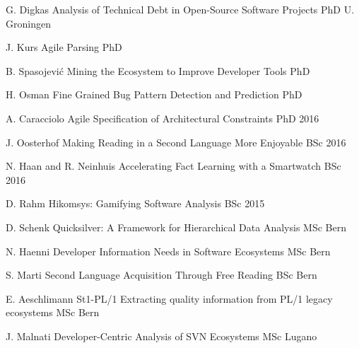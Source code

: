 \begin{enumerate}

\super 
	{G. Digkas}
	{Analysis of Technical Debt in Open-Source Software Projects}
	{PhD}
	{U. Groningen}
	{}

\super 
	{J. Kurs}
	{Agile Parsing}
	{PhD}
	{\Bern}
	{\inprogrcosup}	

\super 
	{B. Spasojevi\'{c}}
	{Mining the Ecosystem to Improve Developer Tools}
	{PhD}
	{\Bern}
	{\inprogrcosup}

\super 
	{H. Osman}
	{Fine Grained Bug Pattern Detection and Prediction}
	{PhD}
	{\Bern}
	{\inprogrcosup}	

\super 
	{A. Caracciolo}
	{Agile Specification of Architectural Constraints}
	{PhD}
	{\Bern}
	{2016 }

\super 
	{J. Oosterhof}
	{Making Reading in a Second Language More Enjoyable}
	{BSc}
	{\Groningen}
	{2016}

\super 
	{N. Haan and R. Neinhuis}
	{Accelerating Fact Learning with a Smartwatch}
	{BSc}
	{\Groningen}
	{2016}


\super 
	{D. Rahm}
	{Hikomsys: Gamifying Software Analysis}
	{BSc}
	{\Bern}
	{2015}


\super 
	{D. Schenk}
	{Quicksilver: A Framework for Hierarchical Data Analysis}
	{MSc}
	{Bern}
	{}

\super 
	{N. Haenni}
	{Developer Information Needs in Software Ecosystems}
	{MSc}
	{Bern}
	{}

\super 
	{S. Marti}
	{Second Language Acquisition Through Free Reading}
	{BSc}
	{Bern}
	{}

\super 
	{E. Aeschlimann}
	{St1-PL/1
Extracting quality information from PL/1 legacy ecosystems}
	{MSc}
	{Bern}
	{}



\super 
	{J. Malnati}
	{Developer-Centric Analysis of SVN Ecosystems}
	{MSc}
	{Lugano}
	{}



\end{enumerate}